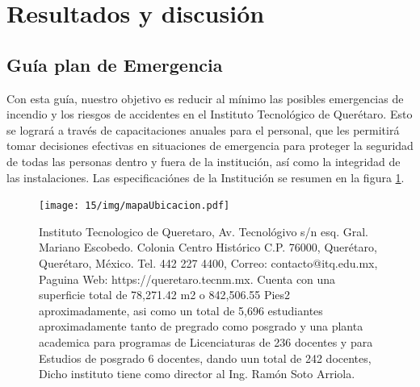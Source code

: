     
    
    \section{Resultados y discusión}
    
    \subsection{Guía plan de Emergencia}
    
    Con esta guía, nuestro objetivo es reducir al mínimo las posibles emergencias de incendio y los riesgos de accidentes en el Instituto Tecnológico de Querétaro. Esto se logrará a través de capacitaciones anuales para el personal, que les permitirá tomar decisiones efectivas en situaciones de emergencia para proteger la seguridad de todas las personas dentro y fuera de la institución, así como la integridad de las instalaciones. Las especificaciónes de la Institución se resumen en la figura \ref{fig:mapaUbicacion}.
    
    \begin{figure}[H]
        \centering
        \texttt{[image: 15/img/mapaUbicacion.pdf]}
        \caption{Instituto Tecnologico de Queretaro, Av. Tecnológivo s/n esq. Gral. Mariano Escobedo. Colonia Centro Histórico C.P. 76000, Querétaro, Querétaro, México. Tel. 442 227 4400, Correo: contacto@itq.edu.mx, Paguina Web: https://queretaro.tecnm.mx. 
        Cuenta con una	superficie total de 78,271.42 m2 o 842,506.55 Pies2 aproximadamente, asi como un total de 5,696 estudiantes aproximadamente tanto de pregrado como posgrado y una planta academica para programas de Licenciaturas de 236 docentes y para Estudios de posgrado 6 docentes, dando uun total de 242 docentes, Dicho instituto tiene como director al Ing. Ramón Soto Arriola. }
        \label{fig:mapaUbicacion}
    \end{figure}
    
